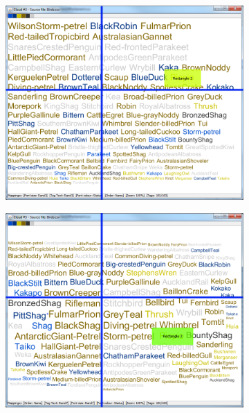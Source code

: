 \begin{figure}[!htb]
\begin{subfigure}{.5\textwidth}
\end{subfigure}
\begin{subfigure}{.5\textwidth}
  \centering
  \includegraphics[scale=0.25]{Experiment1/Trial2/C2S2L2.png}
\end{subfigure}%
\begin{subfigure}{.5\textwidth}
  \centering
 \includegraphics[scale=0.25]{Experiment1/Trial2/C2S2L1.png}
\end{subfigure}
\begin{subfigure}{.5\textwidth}
  \centering

\end{subfigure}
\end{figure}

